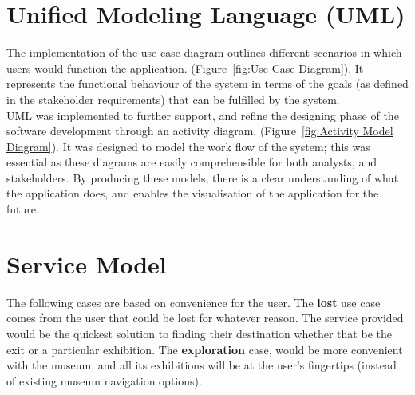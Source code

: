 

\section{Unified Modeling Language (UML)}

The implementation of the use case diagram outlines different scenarios in which users would function the application. (Figure~\ref{fig:Use Case Diagram}). It represents the functional behaviour of the system in terms of the goals (as defined in the stakeholder requirements) that can be fulfilled by the system.\\

UML was implemented to further support, and refine the designing phase of the software development through an activity diagram. (Figure~\ref{fig:Activity Model Diagram}). It was designed to model the work flow of the system; this was essential as these diagrams are easily comprehensible for both analysts, and stakeholders. By producing these models, there is a clear understanding of what the application does, and enables the visualisation of the application for the future.\\

\section{Service Model}
The following cases are based on convenience for the user. The \textbf{lost} use case comes from the user that could be lost for whatever reason. The service provided would be the quickest solution to finding their destination whether that be the exit or a particular exhibition. The \textbf{exploration} case, would be more convenient with the museum, and all its exhibitions will be at the user's fingertips (instead of existing museum navigation options).

